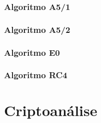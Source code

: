 \subsubsection{Algoritmo A5/1}
\label{algorithm-a51}

\subsubsection{Algoritmo A5/2}
\label{algorithm-a52}

\subsubsection{Algoritmo E0}
\label{algorithm-e0}

\subsubsection{Algoritmo RC4}
\label{algorithm-rc4}

\section{Criptoanálise}